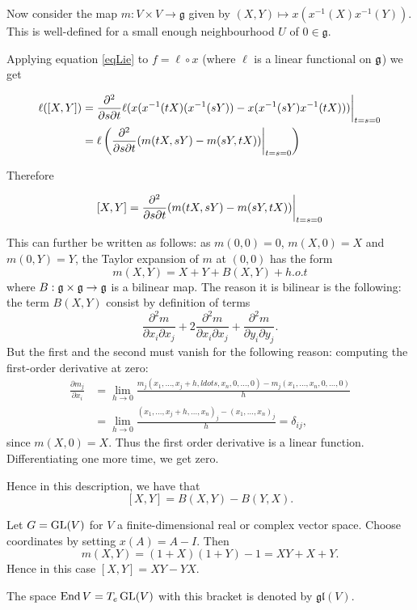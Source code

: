 \documentclass[11pt, english]{article}
\begin{document}
Now consider the map $m:V \times V \to \mathfrak g$ given by $(X,Y) \mapsto x(x^{-1}(X)x^{-1}(Y))$. This is well-defined for a small enough neighbourhood $U$ of $0 \in \mathfrak g$. 

Applying equation \eqref{eqLie} to $f = \ell \circ x$ (where $\ell$ is a linear functional on $\mathfrak g$) we get 

\begin{align*}
\ell([X,Y]) &= \restr{\frac{\partial^2}{\partial s \partial t} \ell(x(x^{-1}(tX)(x^{-1}(sY))-x(x^{-1}(sY)x^{-1}(tX)))}{t=s=0} \\
&= \ell \left(\restr{\frac{\partial^2}{\partial s \partial t} (m(tX,sY) - m(sY,tX))}{t=s=0} \right)
\end{align*}

Therefore 

$$
[X,Y] = \restr{\frac{\partial^2}{\partial s \partial t} (m(tX,sY) - m(sY,tX))}{t=s=0} 
$$

This can further be written as follows: as $m(0,0)=0$, $m(X,0)=X$ and $m(0,Y)=Y$, the Taylor expansion of $m$ at $(0,0)$ has the form
$$
m(X,Y) = X+Y + B(X,Y) + h.o.t
$$
where $B: \mathfrak g \times \mathfrak g \to \mathfrak g$ is a bilinear map. The reason it is bilinear is the following: the term $B(X,Y)$ consist by definition of terms
$$
 \frac{\partial^2 m}{\partial x_i \partial x_j} +2 \frac{\partial^2 m}{\partial x_i \partial x_j} +  \frac{\partial^2 m }{\partial y_i \partial y_j}.
$$
But the first and the second must vanish for the following reason: computing the first-order derivative at zero:
\begin{align*}
  \frac{\partial m_j}{\partial x_i} &= \lim_{h \to 0} \frac{m_j(x_1,\ldots,x_j+h,ldots,x_n,0,\ldots,0) - m_j(x_1,\ldots,x_n,0,\ldots,0)}{h} \\
&= \lim_{h \to 0} \frac{(x_1,\ldots,x_j+h,\ldots,x_n)_j-(x_1,\ldots,x_n)_j}{h} = \delta_{ij},
\end{align*}
since $m(X,0)=X$. Thus the first order derivative is a linear function. Differentiating one more time, we get zero.

Hence in this description, we have that
$$
[X,Y] = B(X,Y) - B(Y,X).
$$

\begin{example}
Let $G= \operatorname{GL}(V)$ for $V$ a finite-dimensional real or complex vector space. Choose coordinates by setting $x(A) = A-I$. Then
$$
m(X,Y) = (1+X)(1+Y)-1  = XY+ X+Y.
$$
Hence in this case $[X,Y]= XY-YX$. 
\end{example}

The space $\operatorname{End} V=T_e \operatorname{GL}(V)$ with this bracket is denoted by $\mathfrak {gl}(V)$. 
\end{document}
